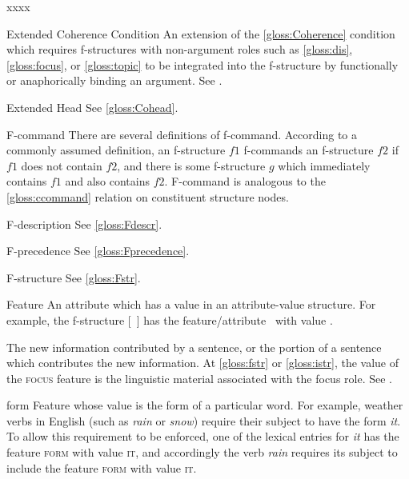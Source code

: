\documentclass[output=paper,colorlinks,citecolor=brown]{langscibook}
\begin{document}
\begin{labeling}{xxxx}
\item[Extended Coherence Condition] An extension of the \ref{gloss:Coherence} condition which requires f-structures with non-argument roles such as \ref{gloss:dis}, \ref{gloss:focus}, or \ref{gloss:topic} to be integrated into the f-structure by functionally or anaphorically binding an argument. See .

\item[Extended Head] See \ref{gloss:Cohead}.

\item[F-command] There are several definitions of f-command.  According to a commonly assumed definition, an f-structure $f1$ f-commands an f-structure $f2$ if $f1$ does not contain $f2$, and there is some f-structure $g$ which immediately contains $f1$ and also contains $f2$.  F-command is analogous to the \ref{gloss:ccommand} relation on constituent structure nodes.

\item[F-description] See \ref{gloss:Fdescr}.

\item[F-precedence] See \ref{gloss:Fprecedence}.

\item[F-structure] See \ref{gloss:Fstr}.

\item[Feature\namedlabel{gloss:Feature}{Feature}] An attribute which has a value in an attribute-value structure.  For example, the f-structure \mbox{[\TENSE~\PST{}]} has the feature/attribute \TENSE\ with value \PST.

\item[\FOCUS\namedlabel{gloss:focus}{\FOCUS}] The new information contributed by a sentence, or the portion of a sentence which contributes the new information.  At \ref{gloss:fstr} or \ref{gloss:istr}, the value of the \textsc{focus} feature is the linguistic material associated with the focus role.  See .

\item[form] Feature whose value is the form of a particular word.  For example, weather verbs in English (such as \emph{rain} or \emph{snow}) require their subject to have the form \emph{it}.  To allow this requirement to be enforced, one of the lexical entries for \emph{it} has the feature \textsc{form} with value \textsc{it}, and accordingly the verb \emph{rain} requires its subject to include the feature \textsc{form} with value \textsc{it}.


\end{labeling}
\end{document}
